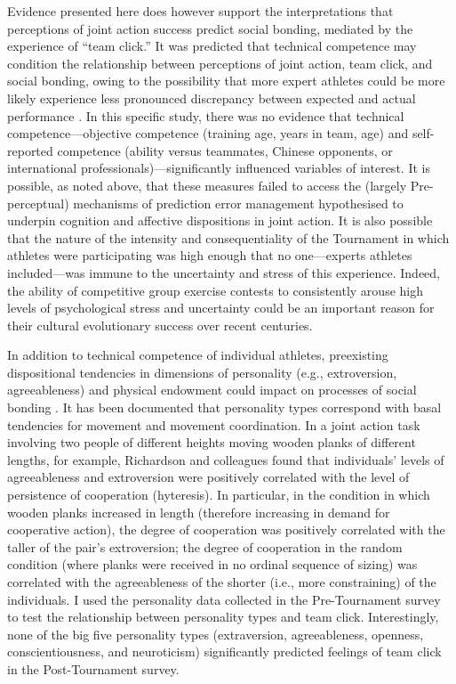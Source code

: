 \begin{CJK}{UTF8}{gbsn}
  Evidence presented here does however support the interpretations that perceptions of joint action success predict social bonding, mediated by the experience of ``team click.'' It was predicted that technical competence may condition the relationship between perceptions of joint action, team click, and social bonding, owing to the possibility that more expert athletes could be more likely experience less pronounced discrepancy between expected and actual performance \cite{Tomeo2012}.  In this specific study, there was no evidence that technical competence---objective competence (training age, years in team, age) and self-reported competence (ability versus teammates, Chinese opponents, or international professionals)---significantly influenced variables of interest.  It is possible, as noted above, that these measures failed to access the (largely Pre-perceptual) mechanisms of prediction error management hypothesised to underpin cognition and affective dispositions in joint action.  It is also possible that the nature of the intensity and consequentiality of the Tournament in which athletes were participating was high enough that no one---experts athletes included---was immune to the uncertainty and stress of this experience. Indeed, the ability of competitive group exercise contests to consistently arouse high levels of psychological stress and uncertainty could be an important reason for their cultural evolutionary success over recent centuries.

  In addition to technical competence of individual athletes, preexisting dispositional tendencies in dimensions of personality (e.g., extroversion, agreeableness) and physical endowment could impact on processes of social bonding \citep{Marsh2009,VonRueden2015}.   It has been documented that personality types correspond with basal tendencies for movement and movement coordination. In a joint action task involving two people of different heights moving wooden planks of different lengths, for example, Richardson and colleagues \textcite{Richardson2007} found that individuals’ levels of agreeableness and extroversion were positively correlated with the level of persistence of cooperation (hyteresis).  In particular, in the condition in which wooden planks increased in length (therefore increasing in demand for cooperative action), the degree of cooperation was positively correlated with the taller of the pair’s extroversion; the degree of cooperation in the random condition (where planks were received in no ordinal sequence of sizing) was correlated with the agreeableness of the shorter (i.e., more constraining) of the individuals.  I used the personality data collected in the Pre-Tournament survey to test the relationship between personality types and team click. Interestingly, none of the big five personality types (extraversion, agreeableness, openness, conscientiousness, and neuroticism) significantly predicted feelings of team click in the Post-Tournament survey.


\end{CJK}
